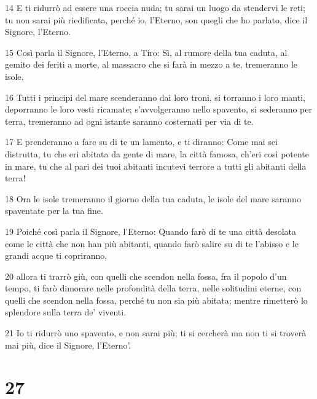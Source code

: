 \par 14 E ti ridurrò ad essere una roccia nuda; tu sarai un luogo da stendervi le reti; tu non sarai più riedificata, perché io, l'Eterno, son quegli che ho parlato, dice il Signore, l'Eterno.
\par 15 Così parla il Signore, l'Eterno, a Tiro: Sì, al rumore della tua caduta, al gemito dei feriti a morte, al massacro che si farà in mezzo a te, tremeranno le isole.
\par 16 Tutti i principi del mare scenderanno dai loro troni, si torranno i loro manti, deporranno le loro vesti ricamate; s'avvolgeranno nello spavento, si sederanno per terra, tremeranno ad ogni istante saranno costernati per via di te.
\par 17 E prenderanno a fare su di te un lamento, e ti diranno: Come mai sei distrutta, tu che eri abitata da gente di mare, la città famosa, ch'eri così potente in mare, tu che al pari dei tuoi abitanti incutevi terrore a tutti gli abitanti della terra!
\par 18 Ora le isole tremeranno il giorno della tua caduta, le isole del mare saranno spaventate per la tua fine.
\par 19 Poiché così parla il Signore, l'Eterno: Quando farò di te una città desolata come le città che non han più abitanti, quando farò salire su di te l'abisso e le grandi acque ti copriranno,
\par 20 allora ti trarrò giù, con quelli che scendon nella fossa, fra il popolo d'un tempo, ti farò dimorare nelle profondità della terra, nelle solitudini eterne, con quelli che scendon nella fossa, perché tu non sia più abitata; mentre rimetterò lo splendore sulla terra de' viventi.
\par 21 Io ti ridurrò uno spavento, e non sarai più; ti si cercherà ma non ti si troverà mai più, dice il Signore, l'Eterno'.

\chapter{27}

